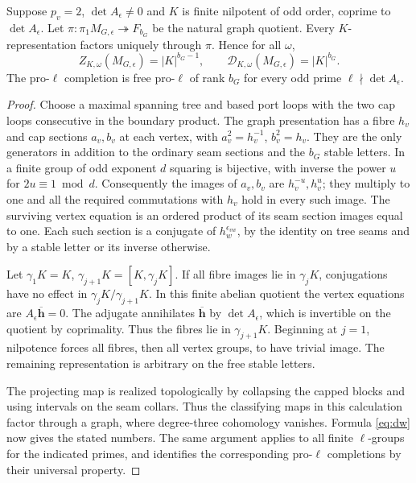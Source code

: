 \begin{theorem}\label{thm:nilp}
Suppose \(p_v=2\), \(\det A_\epsilon\ne0\) and \(K\) is finite
nilpotent of odd order, coprime to \(\det A_\epsilon\).
Let \(\pi:\pi_1 M_{G,\epsilon}\twoheadrightarrow F_{b_G}\) be
the natural graph quotient. Every \(K\)-representation factors
uniquely through \(\pi\). Hence for all \(\omega\),
\[
 Z_{K,\omega}(M_{G,\epsilon})=|K|^{b_G-1},\qquad
 \mathcal D_{K,\omega}(M_{G,\epsilon})=|K|^{b_G}.
\]
The pro-\(\ell\) completion is free pro-\(\ell\) of rank \(b_G\)
for every odd prime \(\ell\nmid\det A_\epsilon\).
\end{theorem}
\begin{proof}
Choose a maximal spanning tree and based port loops with the
two cap loops consecutive in the boundary product. The graph
presentation has a fibre \(h_v\) and cap sections \(a_v,b_v\)
at each vertex, with \(a_v^2=h_v^{-1}\), \(b_v^2=h_v\).
They are the only generators in addition to the ordinary seam
sections and the \(b_G\) stable letters. In a finite group of odd
exponent \(d\) squaring is bijective, with inverse the power
\(u\) for \(2u\equiv1\bmod d\). Consequently the images of \(a_v,b_v\)
are \(h_v^{-u},h_v^u\); they multiply to one and all the required
commutations with \(h_v\) hold in every such image.
The surviving vertex equation is an ordered product of its seam
section images equal to one. Each such section is a conjugate of
\(h_w^{\epsilon_{vw}}\), by the identity on tree seams and by a
stable letter or its inverse otherwise.

Let \(\gamma_1K=K\), \(\gamma_{j+1}K=[K,\gamma_jK]\).
If all fibre images lie in \(\gamma_jK\), conjugations have no
effect in \(\gamma_jK/\gamma_{j+1}K\). In this finite abelian
quotient the vertex equations are
\(A_\epsilon\overline{\mathbf h}=0\).
The adjugate annihilates \(\overline{\mathbf h}\) by
\(\det A_\epsilon\), which is invertible on the quotient by
coprimality. Thus the fibres lie in \(\gamma_{j+1}K\). Beginning
at \(j=1\), nilpotence forces all fibres, then all vertex groups,
to have trivial image. The remaining representation is arbitrary
on the free stable letters.

The projecting map is realized topologically by collapsing the
capped blocks and using intervals on the seam collars. Thus the
classifying maps in this calculation factor through a graph,
where degree-three cohomology vanishes. Formula \eqref{eq:dw}
now gives the stated numbers. The same argument applies to all
finite \(\ell\)-groups for the indicated primes, and identifies
the corresponding pro-\(\ell\) completions by their universal
property.
\end{proof}

